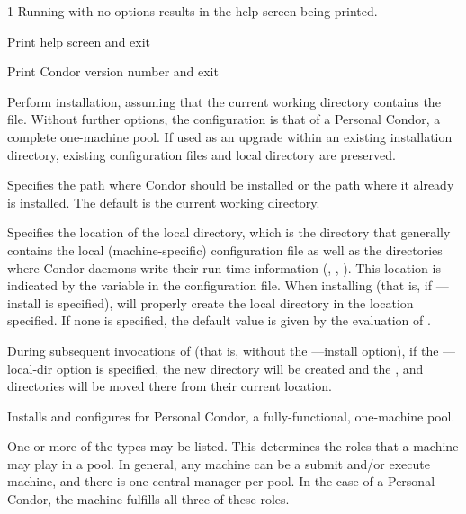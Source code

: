 \begin{ManPage}{\label{man-condor-configure}}{1}
Running  with no options results in the
help screen being printed.

\begin{Options}
	 {Print help screen and exit}

	 {Print Condor version number and exit}

	 {Perform installation, assuming that
	the current working directory contains the 
	file.  Without further options, the configuration is that of
	a Personal Condor, a complete one-machine pool.
	If used as an 
	upgrade within an existing installation directory, existing 
	configuration files and local directory are preserved.}

	 {Specifies the path
	where Condor should be installed or the path where it already is
	installed. The default is the current working directory.}

	 {Specifies the
	location of the local directory, which is the directory that generally 
	contains the local (machine-specific) configuration file as well as the
	directories where Condor daemons write their run-time information 
	(, , ).
	This location is indicated  by the  
	variable in the configuration file. 
	When installing (that is, if ---install is specified),
	will properly create the local directory in the location specified.
	If none is specified, the default value is given by the evaluation of
        .

	During subsequent invocations of 
	(that is, without the ---install option),
	if the ---local-dir option is specified, the new directory
	will be created and the ,  and  
	directories will be moved there from their current location.}

	 {Installs and configures for 
	 Personal Condor, a fully-functional, one-machine pool.}

	 {One
	or more of the types may be listed.
	This determines the roles that a machine may play in a pool.
	In general, any machine can be a submit and/or execute machine,
	and there is one central manager per pool.
	In the case of a Personal Condor,
	the machine fulfills all three of these roles.}


\end{Options}
\end{ManPage}
